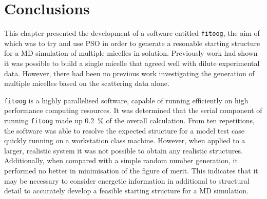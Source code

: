 \section{Conclusions}
This chapter presented the development of a software entitled \texttt{fitoog}, the aim of which was to try and use PSO in order to generate a resonable starting structure for a MD simulation of multiple micelles in solution.
Previously work had shown it was possible to build a single micelle that agreed well with dilute experimental data.
However, there had been no previous work investigating the generation of multiple micelles based on the scattering data alone.

\texttt{fitoog} is a highly parallelised software, capable of running efficiently on high performance computing resources.
It was determined that the serial component of running \texttt{fitoog} made up \SI{0.2}{\percent} of the overall calculation.
From ten repetitions, the software was able to resolve the expected structure for a model test case quickly running on a workstation class machine.
However, when applied to a larger, realistic system it was not possible to obtain any realistic structures.
Additionally, when compared with a simple random number generation, it performed no better in minimisation of the figure of merit. 
This indicates that it may be necessary to consider energetic information in additional to structural detail to accurately develop a feasible starting structure for a MD simulation. 